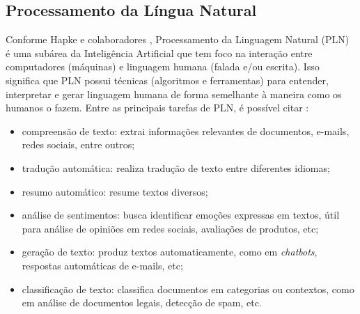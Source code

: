 \documentclass[10pt, conference, compsocconf]{IEEEtran}
\begin{document}




\subsection{Processamento da Língua Natural}

Conforme Hapke e colaboradores \cite{hapke2019natural}, Processamento da Linguagem Natural (PLN) é uma subárea da Inteligência Artificial que tem foco na interação entre computadores (máquinas) e linguagem humana (falada e/ou escrita). Isso significa que PLN possui técnicas (algoritmos e ferramentas) para entender, interpretar e gerar linguagem humana de forma semelhante à maneira como os humanos o fazem. Entre as principais tarefas de PLN, é possível citar \cite{hapke2019natural}:

\begin{itemize}
    \item compreensão de texto: extrai informações relevantes de documentos, e-mails, redes sociais, entre outros;
    \item tradução automática: realiza tradução de texto entre diferentes idiomas;
    \item resumo automático: resume textos diversos;
    \item análise de sentimentos: busca identificar emoções expressas em textos, útil para análise de opiniões em redes sociais, avaliações de produtos, etc;
    \item geração de texto: produz textos automaticamente, como em \textit{chatbots}, respostas automáticas de e-mails, etc;
    \item classificação de texto: classifica documentos em categorias ou contextos, como em análise de documentos legais, detecção de spam, etc.
\end{itemize}
\end{document}

